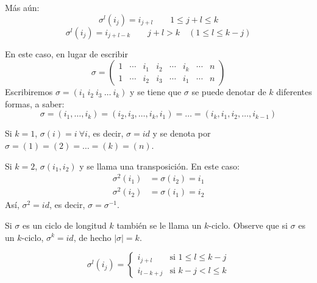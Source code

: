 Más aún:
\begin{equation*}
    \sigma^l(i_j) = i_{j+l} \qquad 1 \leq j+l \leq k
\end{equation*}
\begin{equation*}
    \sigma^l(i_j) = i_{j+l-k} \qquad j+l > k \quad (1 \leq l \leq k-j)
\end{equation*}

En este caso, en lugar de escribir
\begin{equation*}
    \sigma = \begin{pmatrix} 1 & \cdots & i_1 & i_2 & \cdots & i_k & \cdots & n \\ 1 & \cdots & i_2 & i_3 & \cdots & i_1 & \cdots & n \end{pmatrix}
\end{equation*}
Escribiremos $\sigma = (i_1 \ i_2 \ i_3 \ \dots \ i_k)$ y se tiene que $\sigma$ se puede denotar de $k$ diferentes formas, a saber:
\begin{equation*}
    \sigma = (i_1, \dots, i_k) = (i_2, i_3, \dots, i_k, i_1) = \dots = (i_k, i_1, i_2, \dots, i_{k-1})
\end{equation*}

Si $k=1$, $\sigma(i) = i \ \forall i$, es decir, $\sigma = id$ y se denota por $\sigma = (1) = (2) = \dots = (k) = (n)$.

Si $k=2$, $\sigma(i_1, i_2)$ y se llama una transposición. En este caso:
\begin{equation*}
\begin{aligned}
    \sigma^2(i_1) &= \sigma(i_2) = i_1 \\
    \sigma^2(i_2) &= \sigma(i_1) = i_2
\end{aligned}
\end{equation*}
Así, $\sigma^2 = id$, es decir, $\sigma = \sigma^{-1}$.

\vspace{0.5cm}

Si $\sigma$ es un ciclo de longitud $k$ también se le llama un $k$-ciclo. Observe que si $\sigma$ es un $k$-ciclo, $\sigma^k = id$, de hecho $|\sigma| = k$.

\begin{equation*}
    \sigma^l(i_j) = \begin{cases} 
        i_{j+l} & \text{si } 1 \leq l \leq k-j \\
        i_{l-k+j} & \text{si } k-j < l \leq k
    \end{cases}
\end{equation*}

